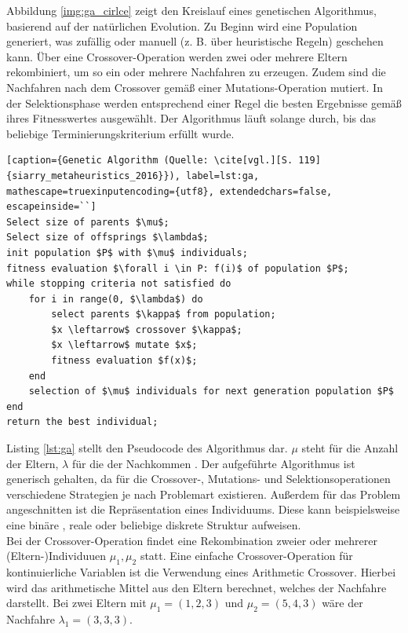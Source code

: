 Abbildung \ref{img:ga_cirlce} zeigt den Kreislauf eines genetischen Algorithmus, basierend auf der natürlichen Evolution. Zu Beginn wird eine Population generiert, was zufällig oder manuell (z. B. über heuristische Regeln) geschehen kann. Über eine Crossover-Operation werden zwei oder mehrere Eltern rekombiniert, um so ein oder mehrere Nachfahren zu erzeugen. Zudem sind die Nachfahren nach dem Crossover gemäß einer Mutations-Operation mutiert. In der Selektionsphase werden entsprechend einer Regel die besten Ergebnisse gemäß ihres Fitnesswertes ausgewählt. Der Algorithmus läuft solange durch, bis das beliebige Terminierungskriterium erfüllt wurde. \cite[vgl.][S. 5]{kramer_genetic_2017} 

\begin{lstlisting}[caption={Genetic Algorithm (Quelle: \cite[vgl.][S. 119]{siarry_metaheuristics_2016}}), label=lst:ga, mathescape=truexinputencoding={utf8}, extendedchars=false, escapeinside=``]
Select size of parents $\mu$;
Select size of offsprings $\lambda$;
init population $P$ with $\mu$ individuals; 
fitness evaluation $\forall i \in P: f(i)$ of population $P$; 
while stopping criteria not satisfied do
    for i in range(0, $\lambda$) do
        select parents $\kappa$ from population;
        $x \leftarrow$ crossover $\kappa$;
        $x \leftarrow$ mutate $x$;
        fitness evaluation $f(x)$; 
    end
    selection of $\mu$ individuals for next generation population $P$
end
return the best individual;
\end{lstlisting}

Listing \ref{lst:ga} stellt den Pseudocode des Algorithmus dar. $\mu$ steht für die Anzahl der Eltern, $\lambda$ für die der Nachkommen \cite[vgl.][S. 119]{siarry_metaheuristics_2016}. Der aufgeführte Algorithmus ist generisch gehalten, da für die Crossover-, Mutations- und Selektionsoperationen \cite[vgl.][S. 118]{siarry_metaheuristics_2016} verschiedene Strategien je nach Problemart existieren. Außerdem für das Problem angeschnitten ist die Repräsentation eines Individuums. Diese kann beispielsweise eine binäre \cite[vgl.][S. 137]{siarry_metaheuristics_2016}, reale \cite[vgl.][S. 140]{siarry_metaheuristics_2016} oder beliebige diskrete \cite[vgl.][S. 149]{siarry_metaheuristics_2016} Struktur aufweisen. \\

Bei der Crossover-Operation findet eine Rekombination zweier oder mehrerer (Eltern-)Individuuen $\mu_1, \mu_2$ statt. Eine einfache Crossover-Operation für kontinuierliche Variablen ist die Verwendung eines Arithmetic Crossover. Hierbei wird das arithmetische Mittel aus den Eltern berechnet, welches der Nachfahre darstellt. Bei zwei Eltern mit $\mu_1 = (1, 2, 3)$ und $\mu_2 = (5, 4, 3)$ wäre der Nachfahre $\lambda_1 = (3, 3, 3)$. \cite[vgl.][S. 13]{kramer_genetic_2017}\\

